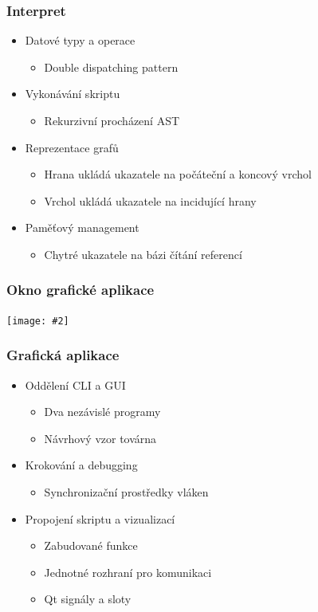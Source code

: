 \documentclass{beamer}
\newcommand{\frameWithTitleImage}[2]
{
	\begin{frame}
		\frametitle{#1}
		\begin{center}
		\texttt{[image: \#2]}
		\end{center}
	\end{frame}
}
\begin{document}
\begin{frame}
	\frametitle{Interpret}
	\begin{itemize}
	\item Datové typy a operace
		\begin{itemize}
		\item Double dispatching pattern
		\end{itemize}
	\item Vykonávání skriptu
		\begin{itemize}
		\item Rekurzivní procházení AST
		\end{itemize}
	\item Reprezentace grafů
		\begin{itemize}
		\item Hrana ukládá ukazatele na počáteční a koncový vrchol
		\item Vrchol ukládá ukazatele na incidující hrany
		\end{itemize}
	\item Paměťový management
		\begin{itemize}
		\item Chytré ukazatele na bázi čítání referencí
		\end{itemize}
	\end{itemize}
\end{frame}


\frameWithTitleImage{Okno grafické aplikace}{../text/img/screenshot.png}


\begin{frame}
	\frametitle{Grafická aplikace}
	\begin{itemize}
	\item Oddělení CLI a GUI
		\begin{itemize}
		\item Dva nezávislé programy
		\item Návrhový vzor továrna
		\end{itemize}
	\item Krokování a debugging
		\begin{itemize}
		\item Synchronizační prostředky vláken
		\end{itemize}
	\item Propojení skriptu a vizualizací
		\begin{itemize}
		\item Zabudované funkce
		\item Jednotné rozhraní pro komunikaci
		\item Qt signály a sloty
		\end{itemize}
	\end{itemize}
\end{frame}
\end{document}
